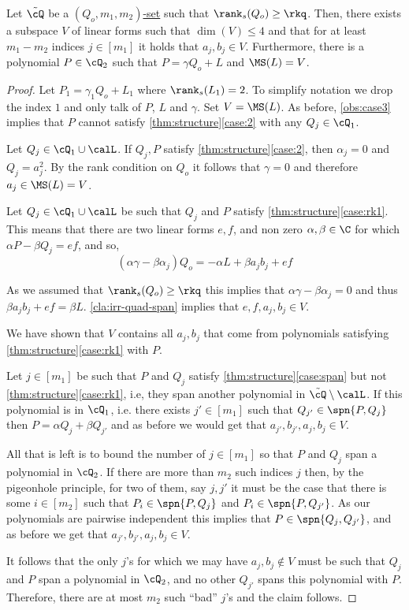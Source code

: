 \begin{claim}\label{cla:small-space-span}
Let $\tilde{\cQ}$ be a \hyperref[def:Q-dom]{$(Q_o,m_1,m_2)$-set} such that $\rank_s(Q_o)\geq \rkq$. 
Then, there exists a subspace $V$ of linear  forms such that $\dim(V) \leq 4$ and that for at least $m_1-m_2 $ indices $j\in [m_1]$ it holds that $a_j,b_j \in V $. Furthermore, there is a polynomial $P\in\cQ_2$ such that $P = \gamma Q_o + L$ and $\MS(L) = V$.
\end{claim}
\begin{proof}
Let $P_1 = \gamma_1Q_o+L_1$ where $\rank_s(L_1) =2$. To simplify notation we drop the index $1$ and only talk of $P$, $L$ and $\gamma$. Set $V = \MS(L)$.
As before, \autoref{obs:case3} implies that $P$ cannot satisfy \autoref{thm:structure}\ref{case:2} with any $Q_j\in \cQ_1$.

Let $Q_j\in\cQ_1\cup\calL$. If $Q_j, P$ satisfy \autoref{thm:structure}\ref{case:2}, then $\alpha_j = 0$ and $Q_j  =a_j^2$. By the rank condition on $Q_o$ it follows that $\gamma = 0$  and therefore $a_j \in \MS(L) = V$.

Let $Q_j\in \cQ_1\cup\calL$ be such that $Q_j$ and $P$ satisfy \autoref{thm:structure}\ref{case:rk1}. This means that there are two linear forms $e,f$, and non zero $\alpha, \beta \in \C$ for which $\alpha P - \beta Q_j = ef$, and so,
\begin{equation}
(\alpha \gamma -\beta\alpha_j)Q_o = -\alpha L + \beta a_jb_j +ef
\end{equation}

As we assumed that $\rank_s(Q_o) \geq \rkq$ this implies that $\alpha \gamma-\beta\alpha_j = 0$ and thus $\beta a_jb_j + ef = \beta L$.  \autoref{cla:irr-quad-span} implies that $e, f, a_{j}, b_{j} \in V$. 

We have shown that $V$ contains all $a_j,b_j$ that come from polynomials satisfying  \autoref{thm:structure}\ref{case:rk1} with $P$.


Let $j\in[m_1]$ be such that $P$ and $Q_j$ satisfy \autoref{thm:structure}\ref{case:span} but not \autoref{thm:structure}\ref{case:rk1}, i.e, they span another polynomial in $\tilde{\cQ}\setminus\calL$. If this polynomial is in $\cQ_1$, i.e. there exists $j' \in [m_1]$ such that $Q_{j'}\in \spn{P,Q_j}$ then $P = \alpha Q_j + \beta Q_{j'}$ and as before we would get that $a_{j'} ,b_{j'}, a_{j}, b_{j} \in V$.

All that is left is to bound the number of $j\in[m_1]$ so that $P$ and $Q_j$ span a polynomial in $\cQ_2$. If there are more than $m_2$ such indices $j$ then, by the pigeonhole principle, for two of them, say $j,j'$ it must be the case that there is some $i \in [m_2]$ such that $P_{i}\in \spn{P,Q_j}$ and $P_{i}\in \spn{P,Q_{j'}}$. As our polynomials are pairwise independent this implies that $P \in \spn{Q_j,Q_{j'}}$, and as before we get that $a_{j'},b_{j'}, a_{j},b_{j}\in V$. 

It follows that the only $j$'s for which we may have $a_j,b_j\not\in V$ must be such that $Q_j$ and $P$ span a polynomial in $\cQ_2$, and no other $Q_{j'}$ spans this polynomial with $P$. Therefore, there are at most $m_2$ such ``bad'' $j$'s and the claim follows. 
\end{proof}


